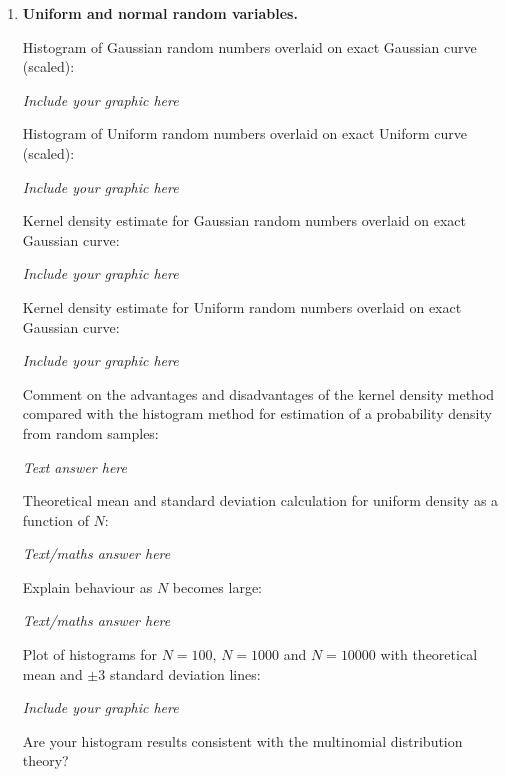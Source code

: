\documentclass[12pt]{article}
\begin{document}
\begin{enumerate}
\item {\bf Uniform and normal random variables.}

Histogram of Gaussian random numbers overlaid on exact Gaussian curve (scaled):

{\em Include your graphic here}
\vspace{3in}

Histogram of Uniform random numbers overlaid on exact Uniform curve (scaled):


{\em Include your graphic here}
\vspace{3in}



Kernel density estimate for Gaussian random numbers overlaid on exact Gaussian curve:


{\em Include your graphic here}
\vspace{3in}



Kernel density estimate for Uniform random numbers overlaid on exact Gaussian curve:


{\em Include your graphic here}
\vspace{3in}

Comment on the advantages and disadvantages of the kernel density method compared with the histogram method for estimation of a probability density from random samples:


{\em Text answer  here}
\vspace{3in}



Theoretical  mean and standard deviation calculation for uniform density as a function of $N$:


{\em Text/maths answer  here}
\vspace{3in}


Explain behaviour as $N$ becomes large:

{\em Text/maths answer  here}
\vspace{3in}



Plot of histograms for $N=100$,  $N=1000$ and $N=10000$ with theoretical mean  and $\pm 3$ standard deviation lines:


{\em Include your graphic here}
\vspace{3in}




 Are your histogram results consistent with the multinomial distribution theory? 



\end{enumerate}
\end{document}
